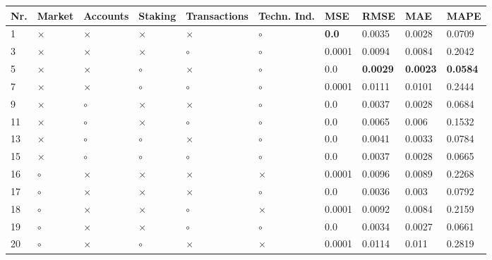 \begin{table}[H]
\centering
\begin{tabular}{|P{0.7cm}|P{1.3cm}P{1.3cm}P{1.3cm}P{1.3cm}P{1.3cm}|P{1.1cm}P{1.1cm}P{1.1cm}P{1.1cm}|}
\hline
 Nr. &   Market & Accounts &  Staking & Transactions & Techn. Ind. &          MSE &            RMSE &             MAE &            MAPE \\
 & $\times$ & $\times$ & $\times$ &     $\times$ &     $\circ$ & \textbf{0.0} &          0.0035 &          0.0028 &          0.0709 \\
   3 & $\times$ & $\times$ & $\times$ &      $\circ$ &     $\circ$ &       0.0001 &          0.0094 &          0.0084 &          0.2042 \\
   5 & $\times$ & $\times$ &  $\circ$ &     $\times$ &     $\circ$ &          0.0 & \textbf{0.0029} & \textbf{0.0023} & \textbf{0.0584} \\
   7 & $\times$ & $\times$ &  $\circ$ &      $\circ$ &     $\circ$ &       0.0001 &          0.0111 &          0.0101 &          0.2444 \\
   9 & $\times$ &  $\circ$ & $\times$ &     $\times$ &     $\circ$ &          0.0 &          0.0037 &          0.0028 &          0.0684 \\
  11 & $\times$ &  $\circ$ & $\times$ &      $\circ$ &     $\circ$ &          0.0 &          0.0065 &           0.006 &          0.1532 \\
  13 & $\times$ &  $\circ$ &  $\circ$ &     $\times$ &     $\circ$ &          0.0 &          0.0041 &          0.0033 &          0.0784 \\
  15 & $\times$ &  $\circ$ &  $\circ$ &      $\circ$ &     $\circ$ &          0.0 &          0.0037 &          0.0028 &          0.0665 \\
  16 &  $\circ$ & $\times$ & $\times$ &     $\times$ &    $\times$ &       0.0001 &          0.0096 &          0.0089 &          0.2268 \\
  17 &  $\circ$ & $\times$ & $\times$ &     $\times$ &     $\circ$ &          0.0 &          0.0036 &           0.003 &          0.0792 \\
  18 &  $\circ$ & $\times$ & $\times$ &      $\circ$ &    $\times$ &       0.0001 &          0.0092 &          0.0084 &          0.2159 \\
  19 &  $\circ$ & $\times$ & $\times$ &      $\circ$ &     $\circ$ &          0.0 &          0.0034 &          0.0027 &          0.0661 \\
  20 &  $\circ$ & $\times$ &  $\circ$ &     $\times$ &    $\times$ &       0.0001 &          0.0114 &           0.011 &          0.2819 \\

\end{tabular}
\end{table}
